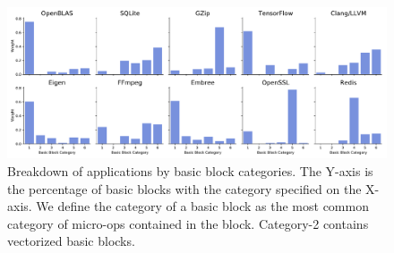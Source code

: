 \begin{figure}[h]
\includegraphics[width=\textwidth]{figures/apps-vs-clusters.pdf}
\caption{Breakdown of applications by basic block categories. The Y-axis is the percentage of basic blocks with the category specified on the X-axis. We define the category of a basic block as the most common category of micro-ops contained in the block.
Category-2 contains vectorized basic blocks.}
\label{fig:apps_vs_clusters}
\end{figure}